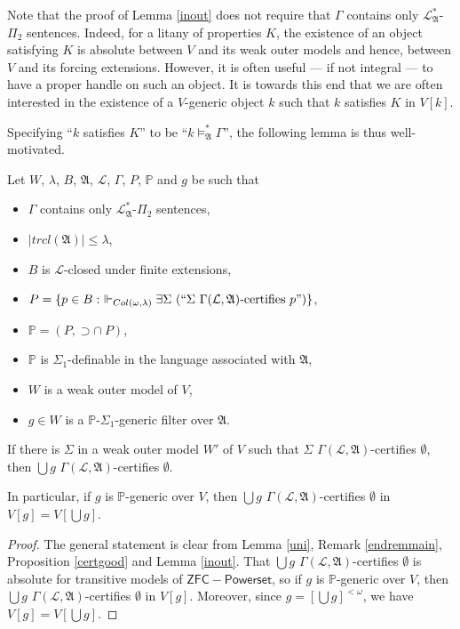\documentclass[12pt]{article}
\numberwithin{equation}{section}
\begin{document}
Note that the proof of Lemma \ref{inout} does not require that $\Gamma$ contains only $\mathcal{L}^*_{\mathfrak{A}}$-$\Pi_2$ sentences. Indeed, for a litany of properties $K$, the existence of an object satisfying $K$ is absolute between $V$ and its weak outer models and hence, between $V$ and its forcing extensions. However, it is often useful --- if not integral --- to have a proper handle on such an object. It is towards this end that we are often interested in the existence of a $V$-generic object $k$ such that $k$ satisfies $K$ in $V[k]$.

Specifying ``$k$ satisfies $K$'' to be ``$k \models^{*}_{\mathfrak{A}} \Gamma$'', the following lemma is thus well-motivated. 

\begin{lem}\label{main2}
Let $W$, $\lambda$, $B$, $\mathfrak{A}$, $\mathcal{L}$, $\Gamma$, $P$, $\mathbb{P}$ and $g$ be such that
\begin{itemize}
    \item $\Gamma$ contains only $\mathcal{L}^{*}_{\mathfrak{A}}$-$\Pi_2$ sentences,
    \item $|trcl(\mathfrak{A})| \leq \lambda$,
    \item $B$ is $\mathcal{L}$-closed under finite extensions,
    \item $P = \{p \in B : \ \Vdash_{Col(\omega, \lambda)} \exists \Sigma \ (``\Sigma \ \Gamma(\mathcal{L}, \mathfrak{A}) \text{-certifies } p")\}$,
    \item $\mathbb{P} = (P, \supset \cap \ P)$, 
    \item $\mathbb{P}$ is $\Sigma_1$-definable in the language associated with $\mathfrak{A}$,
    \item $W$ is a weak outer model of $V$,
    \item $g \in W$ is a $\mathbb{P}$-$\Sigma_1$-generic filter over $\mathfrak{A}$.
\end{itemize}
If there is $\Sigma$ in a weak outer model $W'$ of $V$ such that $\Sigma$ $\Gamma(\mathcal{L}, \mathfrak{A})$-certifies $\emptyset$, then $\bigcup g$ $\Gamma(\mathcal{L}, \mathfrak{A})$-certifies $\emptyset$.

In particular, if $g$ is $\mathbb{P}$-generic over $V$, then $\bigcup g$ $\Gamma(\mathcal{L}, \mathfrak{A})$-certifies $\emptyset$ in $V[g] = V[\bigcup g]$.
\end{lem}

\begin{proof}
The general statement is clear from Lemma \ref{uni}, Remark \ref{endremmain}, Proposition \ref{certgood} and Lemma \ref{inout}. That $\bigcup g$ $\Gamma(\mathcal{L}, \mathfrak{A})$-certifies $\emptyset$ is absolute for transitive models of $\mathsf{ZFC - Powerset}$, so if $g$ is $\mathbb{P}$-generic over $V$, then  $\bigcup g$ $\Gamma(\mathcal{L}, \mathfrak{A})$-certifies $\emptyset$ in $V[g]$. Moreover, since $g = [\bigcup g]^{< \omega}$, we have $V[g] = V[\bigcup g]$.
\end{proof}
\end{document}
